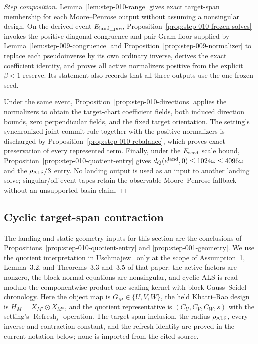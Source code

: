 \begin{proof}[Step composition]
Lemma~\ref{lem:step-010-range} gives exact target-span membership for each
Moore--Penrose output without assuming a nonsingular design.  On the derived
event \(E_{\rm land\_pre}\), Proposition~\ref{prop:step-010-frozen-solves}
invokes the positive diagonal congruence and pair-Gram floor supplied by
Lemma~\ref{lem:step-009-congruence} and
Proposition~\ref{prop:step-009-normalizer} to replace each pseudoinverse by
its own ordinary inverse, derives the exact coefficient identity, and proves
all active normalizers positive from the explicit \(\beta<1\) reserve.  Its
statement also records that all three outputs use the one frozen seed.

Under the same event, Proposition~\ref{prop:step-010-directions} applies the
normalizers to obtain the target-chart coefficient fields, both induced
direction bounds, zero perpendicular fields, and the fixed target
orientation.  The setting's synchronized joint-commit rule together with the
positive normalizers is discharged by
Proposition~\ref{prop:step-010-rebalance}, which proves exact preservation of
every represented term.  Finally, under the \(E_{\rm seed}\) scale
bound, Proposition~\ref{prop:step-010-quotient-entry} gives
\(d_Q(e^{\rm land},0)\le1024\omega\le4096\omega\) and the
\(\rho_{\rm ALS}/3\) entry.  No landing output is used as an input to another
landing solve; singular/off-event tapes retain the observable
Moore--Penrose fallback without an unsupported basin claim.
\end{proof}

\subsection{Cyclic target-span contraction}\label{app:step-011}

The landing and static-geometry inputs for this section are the conclusions of
Propositions~\ref{prop:step-010-quotient-entry} and
\ref{prop:step-001-geometry}.  We use the quotient interpretation in
Uschmajew~\cite{Uschmajew2012} only at the scope of Assumption~1, Lemma~3.2,
and Theorems~3.3 and~3.5 of that paper: the active factors are nonzero, the
block normal equations are nonsingular, and cyclic ALS is read modulo the
componentwise product-one scaling kernel with block-Gauss--Seidel chronology.
Here the object map is $G_M\in\{U,V,W\}$, the held Khatri--Rao design is
$H_M=X_{M'}\odot X_{M''}$, and the quotient representative is
$(C_U,C_V,C_W,s)$ with the setting's $\operatorname{Refresh}_s$ operation.
The target-span inclusion, the radius $\rho_{\rm ALS}$, every inverse and
contraction constant, and the refresh identity are proved in the current
notation below; none is imported from the cited source.

